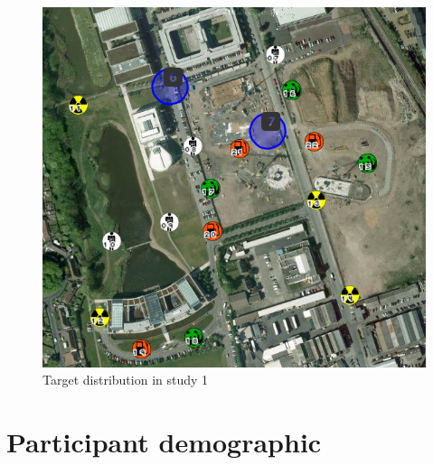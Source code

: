 \begin{figure}[H]
  \centering
  \includegraphics[width=1\textwidth]{img/Appendix/targets1}
  \caption{Target distribution in study 1}
\end{figure}


\section{Participant demographic}

